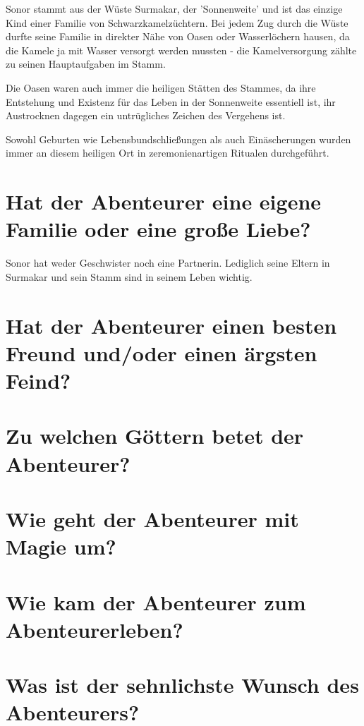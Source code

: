 \documentclass{article}
\begin{document}
	Sonor stammt aus der Wüste Surmakar, der 'Sonnenweite' und ist das
	einzige Kind einer Familie von Schwarzkamelzüchtern. Bei jedem Zug durch
	die Wüste durfte seine Familie in direkter Nähe von Oasen oder
	Wasserlöchern hausen, da die Kamele ja mit Wasser versorgt werden
	mussten - die Kamelversorgung zählte zu seinen Hauptaufgaben im Stamm.

	Die Oasen waren auch immer die heiligen Stätten des Stammes, da ihre
	Entstehung und Existenz für das Leben in der Sonnenweite essentiell ist,
	ihr Austrocknen dagegen ein untrügliches Zeichen des Vergehens ist.
	
	Sowohl Geburten wie Lebensbundschließungen als auch Einäscherungen wurden immer
	an diesem heiligen Ort in zeremonienartigen Ritualen durchgeführt.


	\section[Beziehungsstatus]{Hat der Abenteurer eine eigene Familie oder eine große Liebe?}

	Sonor hat weder Geschwister noch eine Partnerin. Lediglich seine Eltern
	in Surmakar und sein Stamm sind in seinem Leben wichtig.


	\section[Freund und Feind]{Hat der Abenteurer einen besten Freund und/oder einen ärgsten Feind?}



	\section[Religion]{Zu welchen Göttern betet der Abenteurer?}
	
	\section[Magie]{Wie geht der Abenteurer mit Magie um?}

	\section[Schicksal]{Wie kam der Abenteurer zum Abenteurerleben?}

	\section[Antrieb]{Was ist der sehnlichste Wunsch des Abenteurers?}
\end{document}
